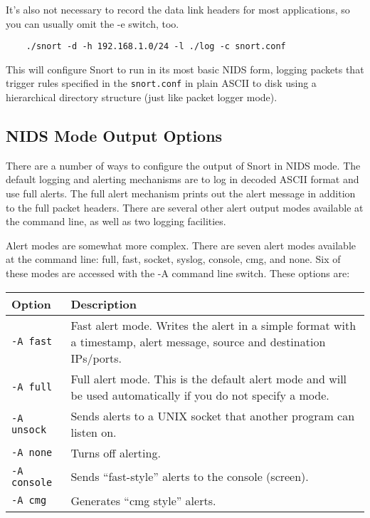 \documentclass[english]{report}
\begin{document}
It's also not necessary to record the data link headers for most applications,
so you can usually omit the -e switch, too.

\begin{verbatim}
    ./snort -d -h 192.168.1.0/24 -l ./log -c snort.conf
\end{verbatim}

This will configure Snort to run in its most basic NIDS form, logging packets
that trigger rules specified in the \texttt{snort.conf} in plain ASCII to disk
using a hierarchical directory structure (just like packet logger mode). 


\subsection{NIDS Mode Output Options}

There are a number of ways to configure the output of Snort in NIDS mode. The
default logging and alerting mechanisms are to log in decoded ASCII format and
use full alerts. The full alert mechanism prints out the alert message in
addition to the full packet headers. There are several other alert output modes
available at the command line, as well as two logging facilities.

Alert modes are somewhat more complex. There are seven alert modes available at
the command line: full, fast, socket, syslog, console, cmg, and none. Six of
these modes are accessed with the -A command line switch.  These options are:

\begin{center}
\begin{tabular}{| l | p{5.4in} |}

\hline
{\bf Option} & {\bf Description}\\
\hline

\hline
{\tt -A fast} &

Fast alert mode. Writes the alert in a simple format with a timestamp, alert
message, source and destination IPs/ports.\\

\hline
{\tt -A full} &

Full alert mode. This is the default alert mode and will be used automatically
if you do not specify a mode.\\

\hline
{\tt -A unsock} &

Sends alerts to a UNIX socket that another program can listen on.\\

\hline
{\tt -A none} &

Turns off alerting.\\

\hline
{\tt -A console} &

Sends ``fast-style'' alerts to the console (screen).\\

\hline
{\tt -A cmg} &

Generates ``cmg style'' alerts.\\

\hline
\end{tabular}
\end{center}
\end{document}
